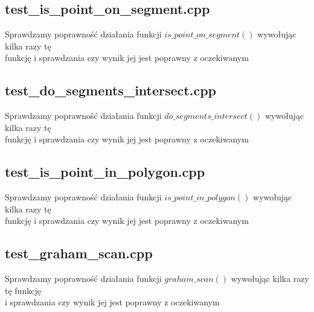 \documentclass{article}
\begin{document}
\subsection{test\_is\_point\_on\_segment.cpp}
Sprawdzamy poprawność działania funkcji $is\_point\_on\_segment()$ wywołując kilka razy tę \\ funkcję i sprawdzania czy wynik jej jest poprawny z oczekiwanym



\subsection{test\_do\_segments\_intersect.cpp}
Sprawdzamy poprawność działania funkcji $do\_segments\_intersect()$ wywołując kilka razy tę \\ funkcję i sprawdzania czy wynik jej jest poprawny z oczekiwanym



\subsection{test\_is\_point\_in\_polygon.cpp}
Sprawdzamy poprawność działania funkcji $is\_point\_in\_polygon()$ wywołując kilka razy tę \\ funkcję i sprawdzania czy wynik jej jest poprawny z oczekiwanym



\subsection{test\_graham\_scan.cpp}
Sprawdzamy poprawność działania funkcji $graham\_scan()$ wywołując kilka razy tę funkcję \\ i sprawdzania czy wynik jej jest poprawny z oczekiwanym


\end{document}
